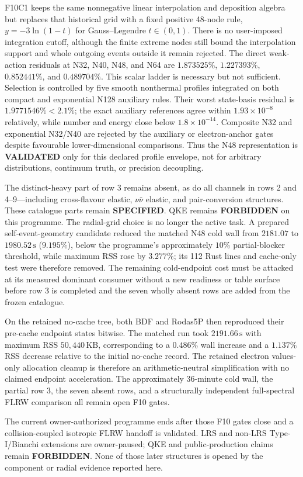 F10C1 keeps the same nonnegative linear interpolation and deposition algebra
but replaces that historical grid with a fixed positive 48-node rule,
$y=-3\ln(1-t)$ for Gauss--Legendre $t\in(0,1)$.  There is no user-imposed
integration cutoff, although the finite extreme nodes still bound the
interpolation support and whole outgoing events outside it remain rejected.
The direct weak-action residuals at N32, N40, N48, and N64 are
$1.873525\%$, $1.227393\%$, $0.852441\%$, and $0.489704\%$.  This scalar
ladder is necessary but not sufficient.  Selection is controlled by five
smooth nonthermal profiles integrated on both compact and exponential N128
auxiliary rules.  Their worst state-basis residual is
$1.9771546\%<2.1\%$; the exact auxiliary references agree within
$1.93\times10^{-8}$ relatively, while number and energy close below
$1.8\times10^{-14}$.  Composite N32 and exponential N32/N40 are rejected by
the auxiliary or electron-anchor gates despite favourable lower-dimensional
comparisons.  Thus the N48 representation is \textbf{VALIDATED} only for this
declared profile envelope, not for arbitrary distributions, continuum truth,
or precision decoupling.

The distinct-heavy part of row 3 remains absent, as do all channels in rows 2
and 4--9---including cross-flavour elastic, $\nu\bar{\nu}$ elastic, and
pair-conversion structures.  These catalogue parts remain \textbf{SPECIFIED}.
QKE remains
\textbf{FORBIDDEN} on this programme.  The radial-grid choice is no longer the
active task.  A prepared self-event-geometry candidate reduced the matched N48
cold wall from $2181.07$ to $1980.52\,\mathrm{s}$ ($9.195\%$), below the
programme's approximately $10\%$ partial-blocker threshold, while maximum RSS
rose by $3.277\%$; its 112 Rust lines and cache-only test were therefore
removed.  The remaining cold-endpoint cost must be attacked at its measured
dominant consumer without a new readiness or table surface before row 3 is
completed and the seven wholly absent rows are added from the frozen
catalogue.

On the retained no-cache tree, both BDF and Rodas5P then reproduced their
pre-cache endpoint states bitwise.  The matched run took
$2191.66\,\mathrm{s}$ with maximum RSS $50{,}440\,\mathrm{KB}$, corresponding
to a $0.486\%$ wall increase and a $1.137\%$ RSS decrease relative to the
initial no-cache record.  The retained electron values-only allocation
cleanup is therefore an arithmetic-neutral simplification with no claimed
endpoint acceleration.  The approximately 36-minute cold wall, the partial
row 3, the seven absent rows, and a structurally independent full-spectral
FLRW comparison all remain open F10 gates.

The current owner-authorized programme ends after those F10 gates close and a
collision-coupled isotropic FLRW handoff is validated.  LRS and non-LRS
Type-I/Bianchi extensions are owner-paused; QKE and public-production claims
remain \textbf{FORBIDDEN}.  None of those later structures is opened by the
component or radial evidence reported here.

